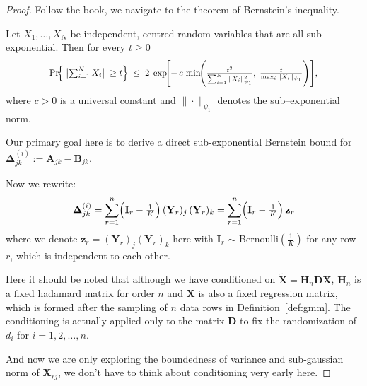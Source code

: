 \documentclass[11pt]{article}
\numberwithin{equation}{section}
\theoremstyle{plain}
\theoremstyle{definition}
\theoremstyle{remark}
\begin{document}
\begin{proof}
Follow the book\cite{vershynin2018high}, we navigate to the theorem of Bernstein’s inequality.

\begin{thm}
  \label{thm:bernstein}
  Let \(X_{1},\dots ,X_{N}\) be independent, centred random variables that
  are all sub–exponential.  Then for every \(t\ge 0\)
  \[
  \scalebox{0.90}{$
  \Pr\!\Bigl\{\;\bigl|\textstyle\sum_{i=1}^{N} X_{i}\bigr|\;\ge t\Bigr\}
     \;\le\;
     2\;\exp\!\Biggl[
       -\,c\,
       \min\!\Biggl(
         \frac{t^{2}}{\sum_{i=1}^{N}\|X_{i}\|_{\psi_{1}}^{2}},
         \;
         \frac{t}{\max_{i}\|X_{i}\|_{\psi_{1}}}
       \Biggr)
     \Biggr],
  $}
  \]
  where \(c>0\) is a universal constant and
  \(\|\cdot\|_{\psi_{1}}\) denotes the sub–exponential norm.
  \end{thm}

Our primary goal here is to derive a 
direct sub-exponential Bernstein bound for $\mathbf{\Delta}_{jk}^{(i)} := \mathbf{A}_{jk} - \mathbf{B}_{jk}$.

Now we rewrite:
\[
  \mathbf{\Delta}_{jk}^{(i)} = \sum_{r=1}^{n}\Bigl(\mathbf{I}_{r}-\tfrac1K\Bigr)\,(\mathbf{Y}_{r})_{j}\,(\mathbf{Y}_{r})_{k} = \sum_{r=1}^{n}\Bigl(\mathbf{I}_{r}-\tfrac1K\Bigr)\, \mathbf{z}_r
\]
where we denote $\mathbf{z}_r=(\mathbf{Y}_{r})_{j}(\mathbf{Y}_{r})_{k}$ here
with $\mathbf{I}_r$ $\sim$ $\text{Bernoulli}(\frac{1}{K})$ for any row $r$, which is independent to each other.

Here it should be noted that although we have conditioned on \(\mathbf{\tilde{X}} = \mathbf{H}_{n}\mathbf{D}\mathbf{X}\),
$\mathbf{H}_{n}$ is a fixed hadamard matrix for order $n$ and $\mathbf{X}$ is also a fixed regression matrix, which is formed after the sampling of $n$ data rows in Definition~\ref{def:gmm}.
The conditioning is actually applied only to the matrix \(\mathbf{D}\) to fix the randomization of \(d_i\) for \(i = 1,2,\ldots,n\).

And now we are only exploring the boundedness of variance and sub-gaussian norm of $\mathbf{X}_{rj}$, we don't have to think about conditioning very early here.


\end{proof}
\end{document}
